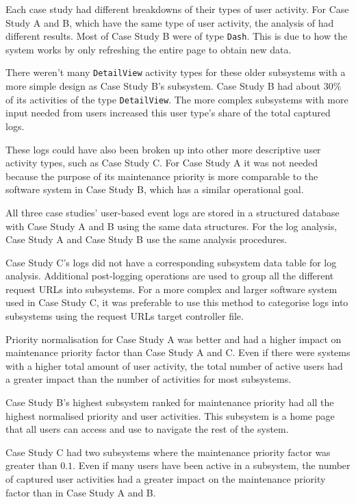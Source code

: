 Each case study had different breakdowns of their types of user activity. For Case Study A and B, which have the same type of user activity, the analysis of  had different results. Most of Case Study B were of type \texttt{Dash}.  This is due to how the system works by only refreshing the entire page to obtain new data. \par There weren't many \texttt{DetailView} activity types for these older subsystems with a more simple design as Case Study B's subsystem. Case Study B had about $30\%$ of its activities of the type \texttt{DetailView}. The more complex subsystems with more input needed from users increased this user type's share of the total captured logs.\par These logs could have also been broken up into other more descriptive user activity types, such as Case Study C. For Case Study A it was not needed because the purpose of its maintenance priority is more comparable to the software system in Case Study B, which has a similar operational goal.\par All three case studies' user-based event logs are stored in a structured database with Case Study A and B using the same data structures. For the log analysis, Case Study A and Case Study B use the same analysis procedures. \par Case Study C's logs did not have a corresponding subsystem data table for log analysis. Additional post-logging operations are used to group all the different request URLs into subsystems. For a more complex and larger software system used in Case Study C, it was preferable to use this method to categorise logs into subsystems using the request URLs target controller file.\par Priority normalisation for Case Study A was better and had a higher impact on maintenance priority factor than Case Study A and C. Even if there were systems with a higher total amount of user activity, the total number of active users had a greater impact than the number of activities for most subsystems. \par Case Study B's highest subsystem ranked for maintenance priority had all the highest normalised priority and user activities. This subsystem is a home page that all users can access and use to navigate the rest of the system. \par Case Study C had two subsystems where the maintenance priority factor was greater than $0.1$. Even if many users have been active in a subsystem, the number of captured user activities had a greater impact on the maintenance priority factor than in Case Study A and B.

